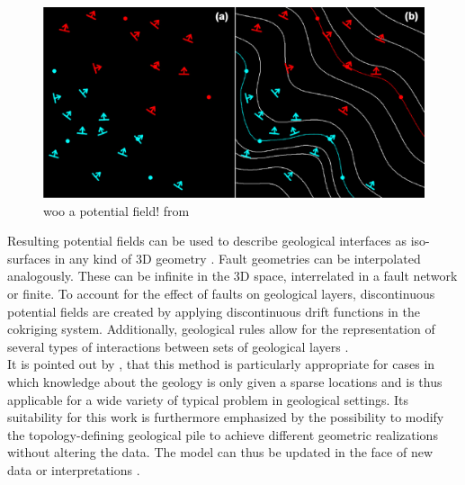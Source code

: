 		\begin{figure}[h]
			\centering
			\includegraphics[width=1\textwidth]{Figures/calcagno_pot_field.png}
			\caption{woo a potential field! from \citet{calcagno2008geological}}\label{fig:pot_field}
		\end{figure}        
        Resulting potential fields can be used to describe geological interfaces as iso-surfaces in any kind of 3D geometry \citep{calcagno2008geological}. Fault geometries can be interpolated analogously. These can be infinite in the 3D space, interrelated in a fault network or finite. To account for the effect of faults on geological layers, discontinuous potential fields are created by applying discontinuous drift functions in the cokriging system. Additionally, geological rules allow for the representation of several types of interactions between sets of geological layers \citep{calcagno2008geological}.\\
        It is pointed out by \citet{calcagno2008geological}, that this method is particularly appropriate for cases in which knowledge about the geology is only given a sparse locations and is thus applicable for a wide variety of typical problem in geological settings. Its suitability for this work is furthermore emphasized by the possibility to modify the topology-defining geological pile to achieve different geometric realizations without altering the data. The model can thus be updated in the face of new data or interpretations \citep{calcagno2008geological}. 
     
